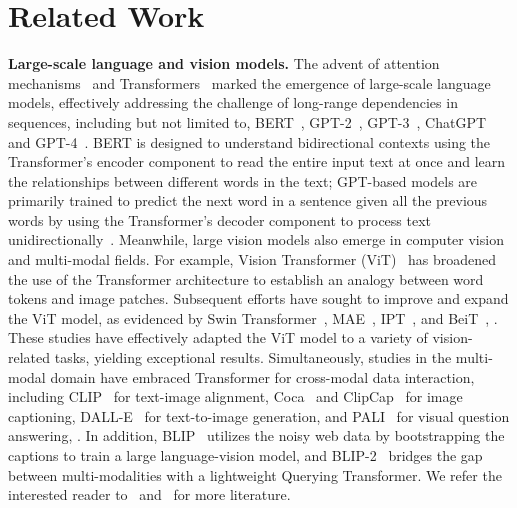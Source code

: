 \section{Related Work}
\label{sec:related}
\noindent \textbf{Large-scale language and vision models.} 
The advent of attention mechanisms~\cite{bahdanau2015neural} and Transformers~\cite{vaswani2017attention} marked the emergence of large-scale language models, effectively addressing the challenge of long-range dependencies in sequences, including but not limited to, BERT~\cite{devlin2019bert}, GPT-2~\cite{radford2019language}, GPT-3~\cite{brown2020language}, ChatGPT~\cite{openai2023chatgpt} and GPT-4~\cite{openai2023gpt4}. BERT is designed to understand bidirectional contexts using the Transformer's encoder component to read the entire input text at once and learn the relationships between different words in the text; GPT-based models are primarily trained to predict the next word in a sentence given all the previous words by using the Transformer's decoder component to process text unidirectionally~\cite{ghojogh2020attention}. Meanwhile, large vision models also emerge in computer vision and multi-modal fields. For example, Vision Transformer (ViT)~\cite{dosovitskiy2020image} has broadened the use of the Transformer architecture to establish an analogy between word tokens and image patches. Subsequent efforts have sought to improve and expand the ViT model, as evidenced by Swin Transformer~\cite{liu2021swin}, MAE~\cite{he2022masked}, IPT~\cite{chen2021pre}, and BeiT~\cite{bao2021beit}, \etc. These studies have effectively adapted the ViT model to a variety of vision-related tasks, yielding exceptional results. Simultaneously, studies in the multi-modal domain have embraced Transformer for cross-modal data interaction, including CLIP~\cite{radford2021learning} for text-image alignment, Coca~\cite{yu2022coca} and ClipCap~\cite{mokady2021clipcap} for image captioning, DALL-E~\cite{ramesh2021zero} for text-to-image generation, and PALI~\cite{wang2023image} for visual question answering, \etc. In addition, BLIP~\cite{li2022blip} utilizes the noisy web data by bootstrapping the captions to train a large language-vision model, and BLIP-2~\cite{li2023blip} bridges the gap between multi-modalities with a lightweight Querying Transformer. We refer the interested reader to~\cite{zhao2023survey} and~\cite{wang2023review} for more literature.

